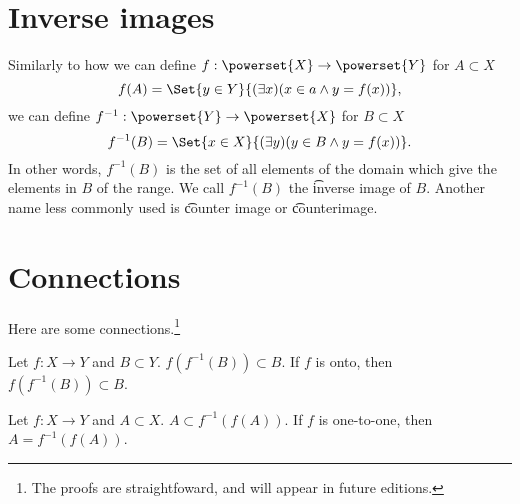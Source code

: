 \section*{Inverse images}

Similarly to how we can define $f: \powerset{X} \to \powerset{Y}$ for $A \subset X$
    \[
f(A) = \Set{y \in Y}{(\exists x)(x \in a \land y = f(x))},
    \]
we can define $f^{-1}: \powerset{Y} \to \powerset{X}$ for $B \subset X$
    \[
f^{-1}(B) = \Set{x \in X}{(\exists y)(y \in B \land y = f(x))}.
    \]
In other words, $f^{-1}(B)$ is the set of all elements of the domain which give the elements in $B$ of the range.
We call $f^{-1}(B)$ the \t{inverse image} of $B$.
Another name less commonly used is \t{counter image} or \t{counterimage}.

\section*{Connections}

Here are some connections.\footnote{The proofs are straightfoward, and will appear in future editions.}
\begin{proposition}
Let $f: X \to Y$ and $B \subset Y$.
$f(f^{-1}(B)) \subset B$. If $f$ is onto, then $f(f^{-1}(B)) \subset B$.\end{proposition}
\begin{proposition}
Let $f: X \to Y$ and $A \subset X$.
$A \subset f^{-1}(f(A))$.
If $f$ is one-to-one, then $A = f^{-1}(f(A))$.\end{proposition}